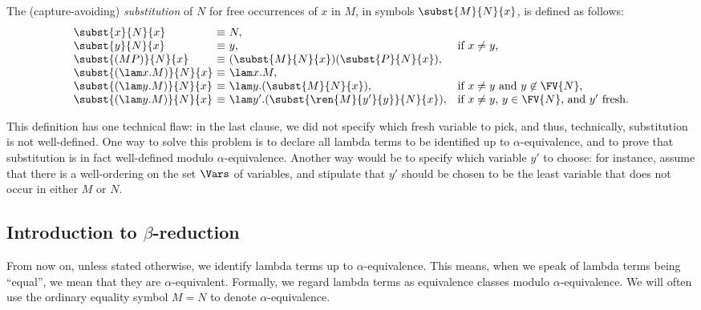 \documentclass[12pt]{article}
\begin{document}
\begin{definition}
  The (capture-avoiding) {\em substitution} of $N$ for free
  occurrences of $x$ in $M$, in symbols $\subst{M}{N}{x}$, is defined
  as follows:
  \[  \begin{array}{l@{~}l@{~}ll}
    \subst{x}{N}{x} &\equiv & N, \\
    \subst{y}{N}{x} &\equiv & y, &\mbox{if $x\neq y$,} \\
    \subst{(MP)}{N}{x} &\equiv & (\subst{M}{N}{x})(\subst{P}{N}{x}), \\
    \subst{(\lam x.M)}{N}{x} &\equiv & \lam x.M, \\
    \subst{(\lam y.M)}{N}{x} &\equiv & \lam y.(\subst{M}{N}{x}), 
    &\mbox{if $x\neq y$ and $y\not\in\FV{N}$,} \\
    \subst{(\lam y.M)}{N}{x} &\equiv & \lam y'.(\subst{\ren{M}{y'}{y}}{N}{x}), 
    &\mbox{if $x\neq y$, $y\in\FV{N}$, and $y'$ fresh.} \\
  \end{array}
  \]
\end{definition}

This definition has one technical flaw: in the last clause, we did not
specify which fresh variable to pick, and thus, technically,
substitution is not well-defined. One way to solve this problem is to
declare all lambda terms to be identified up to $\alpha$-equivalence,
and to prove that substitution is in fact well-defined modulo
$\alpha$-equivalence.  Another way would be to specify which variable
$y'$ to choose: for instance, assume that there is a well-ordering on
the set $\Vars$ of variables, and stipulate that $y'$ should be chosen
to be the least variable that does not occur in either $M$ or $N$.

\subsection{Introduction to $\beta$-reduction}

\begin{convention}
From now on, unless stated otherwise, we identify lambda terms up to
$\alpha$-equivalence. This means, when we speak of lambda terms being
``equal'', we mean that they are $\alpha$-equivalent. Formally, we
regard lambda terms as equivalence classes modulo $\alpha$-equivalence.
We will often use the ordinary equality symbol $M=N$ to denote
$\alpha$-equivalence. 
\end{convention}
\end{document}
